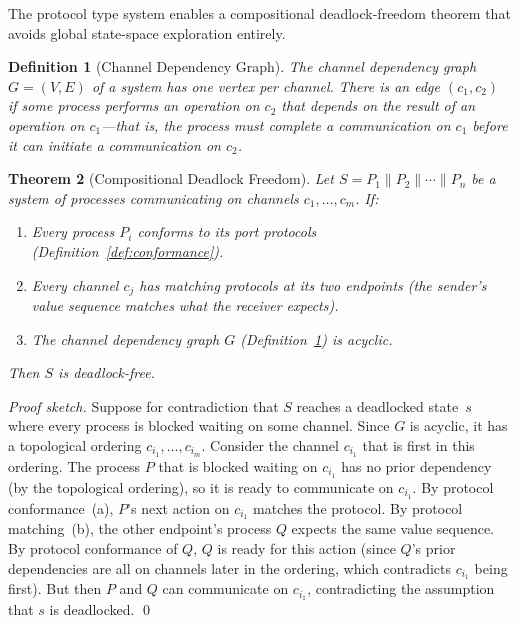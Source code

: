 \documentclass[11pt]{article}
\newtheorem{theorem}{Theorem}[section]
\newtheorem{definition}[theorem]{Definition}
\begin{document}
The protocol type system enables a compositional deadlock-freedom
theorem that avoids global state-space exploration entirely.

\begin{definition}[Channel Dependency Graph]
\label{def:cdg}
The \emph{channel dependency graph} $G = (V, E)$ of a system has one
vertex per channel.  There is an edge $(c_1, c_2)$ if some process
performs an operation on $c_2$ that depends on the result of an
operation on $c_1$---that is, the process must complete a communication
on $c_1$ before it can initiate a communication on $c_2$.
\end{definition}

\begin{theorem}[Compositional Deadlock Freedom]
\label{thm:deadlock-free}
Let $S = P_1 \| P_2 \| \cdots \| P_n$ be a system of processes
communicating on channels $c_1, \ldots, c_m$.  If:
\begin{enumerate}
\item[(a)] Every process $P_i$ conforms to its port protocols
  (Definition~\ref{def:conformance}).
\item[(b)] Every channel $c_j$ has matching protocols at its two
  endpoints (the sender's value sequence matches what the receiver
  expects).
\item[(c)] The channel dependency graph $G$ (Definition~\ref{def:cdg})
  is acyclic.
\end{enumerate}
Then $S$ is deadlock-free.
\end{theorem}

\begin{proof}[Proof sketch]
Suppose for contradiction that $S$ reaches a deadlocked state~$s$
where every process is blocked waiting on some channel.  Since $G$ is
acyclic, it has a topological ordering $c_{i_1}, \ldots, c_{i_m}$.
Consider the channel $c_{i_1}$ that is first in this ordering.
The process $P$ that is blocked waiting on $c_{i_1}$ has no prior
dependency (by the topological ordering), so it is ready to
communicate on $c_{i_1}$.  By protocol conformance~(a), $P$'s next
action on $c_{i_1}$ matches the protocol.  By protocol matching~(b),
the other endpoint's process $Q$ expects the same value sequence.
By protocol conformance of $Q$, $Q$ is ready for this action (since
$Q$'s prior
dependencies are all on channels later in the ordering, which
contradicts $c_{i_1}$ being first).  But then $P$ and $Q$ can
communicate on $c_{i_1}$, contradicting the assumption that $s$ is
deadlocked. \qed
\end{proof}
\end{document}
